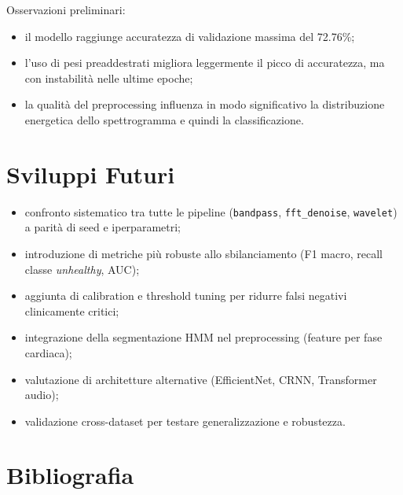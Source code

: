 \documentclass[a4paper,11pt]{article}
\begin{document}
Osservazioni preliminari:
\begin{itemize}
  \item il modello raggiunge accuratezza di validazione massima del 72.76\%;
  \item l'uso di pesi preaddestrati migliora leggermente il picco di accuratezza, ma con instabilità nelle ultime epoche;
  \item la qualità del preprocessing influenza in modo significativo la distribuzione energetica dello spettrogramma e quindi la classificazione.
\end{itemize}

\section{Sviluppi Futuri}
\begin{itemize}
  \item confronto sistematico tra tutte le pipeline (\texttt{bandpass}, \texttt{fft\_denoise}, \texttt{wavelet}) a parità di seed e iperparametri;
  \item introduzione di metriche più robuste allo sbilanciamento (F1 macro, recall classe \emph{unhealthy}, AUC);
  \item aggiunta di calibration e threshold tuning per ridurre falsi negativi clinicamente critici;
  \item integrazione della segmentazione HMM nel preprocessing (feature per fase cardiaca);
  \item valutazione di architetture alternative (EfficientNet, CRNN, Transformer audio);
  \item validazione cross-dataset per testare generalizzazione e robustezza.
\end{itemize}

\section{Bibliografia}


\end{document}
